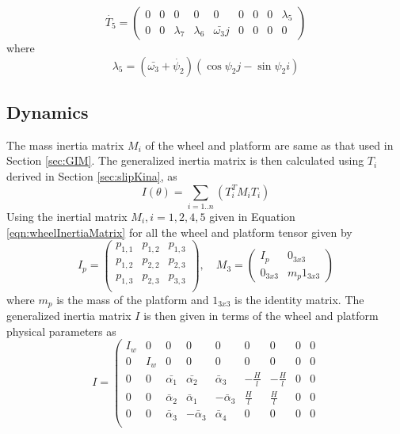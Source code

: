 {\begin{equation}
\label{eqn:slip_dT5}
\dot{T_5}=
\begin{pmatrix}
0 & 0 & 0 & 0 & 0 & 0 & 0 & 0 & \lambda_5\\
0 & 0 & \lambda_7 & \lambda_6 & \bar{\omega_3}j & 0 & 0 & 0 & 0
\end{pmatrix}
\end{equation}
where 
\[ \lambda_5 = (\bar{\omega_3}+\dot{\psi_2}) (\cos\psi_2 j-\sin \psi_2 i) \]
\subsection{Dynamics }
\label{sec:slipDynamics}
The mass inertia matrix $M_i$ of the wheel and platform are same as that used in Section \ref{sec:GIM}. The generalized inertia matrix is then calculated using $T_i$ derived in Section  \ref{sec:slipKina}, as
\begin{equation}
I(\theta)=\sum_{i=1..n}(T_i^TM_iT_i)
\end{equation}
Using the inertial matrix $M_i, i=1,2,4,5$ given in Equation \ref{eqn:wheelInertiaMatrix} for all the wheel and platform tensor given by \[ I_p=\begin{pmatrix}
 p_{1,1} & p_{1,2} & p_{1,3}\\   
 p_{1,2} & p_{2,2} & p_{2,3}\\   
 p_{1,3} & p_{2,3} & p_{3,3}\\   
\end{pmatrix},  \quad  M_3=\begin{pmatrix}
 I_p & 0_{3x3}\\
 0_{3x3} & m_p 1_{3x3}
\end{pmatrix}\]
where $m_p$ is the mass of the platform and $1_{3x3}$ is the identity matrix.
The generalized inertia matrix $I$ is then given in terms of the wheel and platform physical parameters as 
\begin{equation}
    I=
    \left(
\begin{array}{ccccccccc}
I_w & 0 & 0 & 0 & 0 & 0 & 0 & 0 & 0 \\
 0 & I_w & 0 & 0 & 0 & 0 & 0 & 0 & 0 \\
 0 & 0 & \bar{\alpha_1} & \bar{\alpha_2} & \bar \alpha_3  & -\frac{H}{l} & -\frac{H}{l} & 0 & 0 \\
 0 & 0 & \bar \alpha_2 & \bar \alpha_1 & -\bar\alpha_3 & \frac{H}{l} & \frac{H}{l} & 0 & 0 \\
 0 & 0 & \bar\alpha_3 & -\bar\alpha_3 & \bar\alpha_4& 0 & 0 & 0 & 0 \\

\end{array}
\end{equation}}
